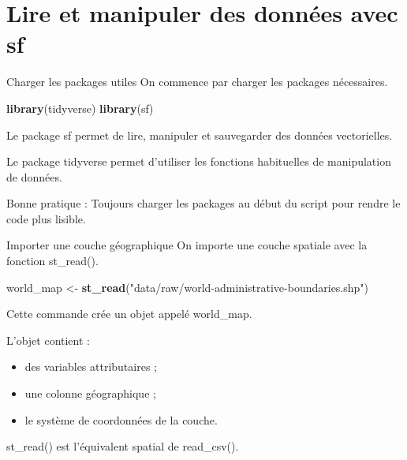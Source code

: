 \documentclass[
  10pt,
  ignorenonframetext,
]{beamer}
\newenvironment{Shaded}{\begin{snugshade}}{\end{snugshade}}
\newcommand{\FunctionTok}[1]{\textcolor[rgb]{0.13,0.29,0.53}{\textbf{#1}}}
\newcommand{\NormalTok}[1]{#1}
\newcommand{\OtherTok}[1]{\textcolor[rgb]{0.56,0.35,0.01}{#1}}
\newcommand{\StringTok}[1]{\textcolor[rgb]{0.31,0.60,0.02}{#1}}
\begin{document}
\section{Lire et manipuler des données avec
sf}\label{lire-et-manipuler-des-donnuxe9es-avec-sf}

\begin{frame}[fragile]{Charger les packages utiles}
\label{charger-les-packages-utiles}
On commence par charger les packages nécessaires.

\begin{Shaded}
\begin{Highlighting}[]
\FunctionTok{library}\NormalTok{(tidyverse)}
\FunctionTok{library}\NormalTok{(sf)}
\end{Highlighting}
\end{Shaded}

Le package sf permet de lire, manipuler et sauvegarder des données
vectorielles.

Le package tidyverse permet d'utiliser les fonctions habituelles de
manipulation de données.

Bonne pratique : Toujours charger les packages au début du script pour
rendre le code plus lisible.
\end{frame}

\begin{frame}[fragile]{Importer une couche géographique}
\label{importer-une-couche-guxe9ographique}
On importe une couche spatiale avec la fonction st\_read().

\begin{Shaded}
\begin{Highlighting}[]
\NormalTok{world\_map }\OtherTok{\textless{}{-}} \FunctionTok{st\_read}\NormalTok{(}\StringTok{"data/raw/world{-}administrative{-}boundaries.shp"}\NormalTok{)}
\end{Highlighting}
\end{Shaded}

Cette commande crée un objet appelé world\_map.

L'objet contient :

\begin{itemize}
\item des variables attributaires ;
\item une colonne géographique ;
\item le système de coordonnées de la couche.
\end{itemize}

st\_read() est l'équivalent spatial de read\_csv().
\end{frame}
\end{document}
